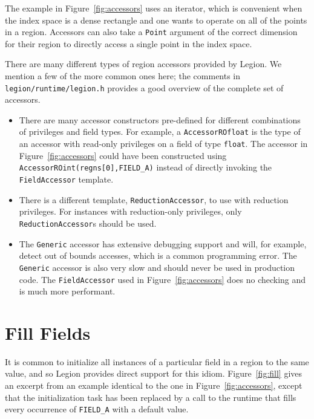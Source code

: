 The example in Figure~\ref{fig:accessors} uses an iterator, which is convenient when the index space is a dense rectangle and one
wants to operate on all of the points in a region.  Accessors can also take a {\tt Point} argument of the correct dimension for their
region to directly access a single point in the index space.

There are many different types of
region accessors provided by Legion.  We mention a few of the more common ones here; the comments in {\tt legion/runtime/legion.h} provides
a good overview of the complete set of accessors.
\begin{itemize}

\item  There are many accessor constructors pre-defined for different combinations of privileges and field types.  For example,
  a {\tt AccessorROfloat} is the type of an accessor with read-only privileges on a field of type {\tt float}.  The accessor in Figure~\ref{fig:accessors}
  could have been constructed using {\tt AccessorROint(regns[0],FIELD\_A)} instead of directly invoking the {\tt FieldAccessor} template.

\item  There is a different template, {\tt ReductionAccessor}, to use with reduction privileges.  For instances with reduction-only privileges, only {\tt ReductionAccessor}s should be used.

\item The {\tt Generic} accessor has 
extensive debugging support and will, for example, detect out of bounds accesses, which is a common programming error.  The {\tt Generic} accessor is also very slow and should never be used in production code.  
The {\tt FieldAccessor} used in Figure~\ref{fig:accessors} does no checking and is much more performant.
\end{itemize}



\section{Fill Fields}
\label{sec:fill}

It is common to initialize all instances of a particular field in a region to the same value, and so Legion
provides direct support for this idiom.  Figure~\ref{fig:fill} gives an excerpt from an example identical
to the one in Figure~\ref{fig:accessors}, except that the initialization task has been replaced by a call to
the runtime that fills every occurrence of {\tt FIELD\_A} with a default value.

